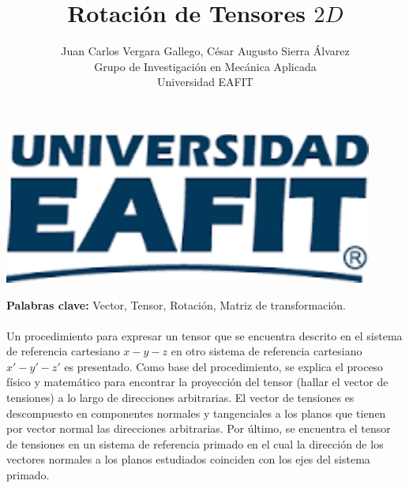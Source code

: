 \documentclass[12pt,letterpaper, twoside, openany]{article}
\author{Juan Carlos Vergara Gallego, César Augusto Sierra Álvarez\\
Grupo de Investigación en Mecánica Aplicada \\ Universidad EAFIT}
\title{\textbf{Rotación de Tensores $2D$}}
\begin{document}
\pagestyle{fancyplain}
\fancyhf{}
\headheight=20pt %
\renewcommand{\headrulewidth}{0pt} %

\lhead %
{
\begin{minipage}{3cm}
\includegraphics[width=1.5 in]{img/logo.pdf}
\end{minipage}
}

\fancyfoot[c]{\thepage}

\maketitle


{\bf Palabras clave:} Vector, Tensor, Rotación, Matriz de transformación.\\\\

\abstract
%
Un procedimiento para expresar un tensor que se encuentra descrito en el sistema de referencia cartesiano $x-y-z$ en otro sistema de referencia cartesiano $x'-y'-z'$ es presentado. Como base del procedimiento, se explica el proceso físico y matemático para encontrar la proyección del tensor (hallar el vector de tensiones) a lo largo de direcciones arbitrarias. El vector de tensiones es descompuesto en componentes normales y tangenciales a los planos que tienen por vector normal las direcciones arbitrarias. Por último, se encuentra el tensor de tensiones en un sistema de referencia primado en el cual la dirección de los vectores normales a los planos estudiados coinciden con los ejes del sistema primado.
%
\end{document}
